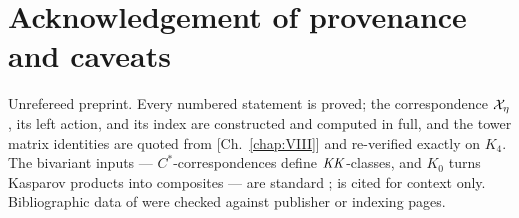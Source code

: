 \section*{Acknowledgement of provenance and caveats}

Unrefereed preprint. Every numbered statement is proved; the correspondence $\mathcal{X}_\eta$, its
left action, and its index are constructed and computed in full, and the tower matrix
identities are quoted from [Ch.~\ref{chap:VIII}] and re-verified exactly on $K_4$. The bivariant inputs
--- $C^*$-correspondences define $\mathit{KK}$-classes, and $K_0$ turns Kasparov products into
composites --- are standard \cite{Kas,Bla}; \cite{KP} is cited for context only.
Bibliographic data of \cite{Kas,Bla,R,KP} were checked against publisher or indexing pages.
